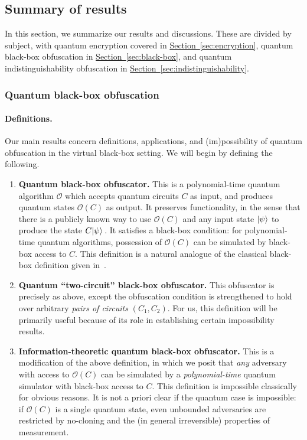 \documentclass[envcountsame]{llncs}
\numberwithin{equation}{section}
\newcommand{\expref}[2]{\texorpdfstring{\hyperref[#2]{#1~\ref{#2}}}{#1~\ref{#2}}}
\newcommand{\algo}{\mathcal}
\begin{document}
\subsection{Summary of results}

In this section, we summarize our results and discussions. These are divided by subject, with quantum encryption covered in \expref{Section}{sec:encryption}, quantum black-box obfuscation in \expref{Section}{sec:black-box}, and quantum indistinguishability obfuscation in \expref{Section}{sec:indistinguishability}.

\subsubsection{Quantum black-box obfuscation}

\paragraph{Definitions.} Our main results concern definitions, applications, and (im)possibility of quantum obfuscation in the virtual black-box setting. We will begin by defining the following.

\begin{enumerate}
\item \textbf{Quantum black-box obfuscator.} This is a polynomial-time quantum algorithm $\algo O$ which accepts quantum circuits $C$ as input, and produces quantum states $\algo O(C)$ as output. It preserves functionality, in the sense that there is a publicly known way to use $\algo O(C)$ and any input state ${\left\vert{\psi}\right\rangle}$ to produce the state $C {\left\vert{\psi}\right\rangle}$\,. It satisfies a black-box condition: for polynomial-time quantum algorithms, possession of $\algo O(C)$ can be simulated by black-box access to $C$. This definition is a natural analogue of the classical black-box definition given in~\cite{BGIRSVY12}.
\item \textbf{Quantum ``two-circuit'' black-box obfuscator.} This obfuscator is precisely as above, except the obfuscation condition is strengthened to hold over arbitrary \emph{pairs of circuits} $(C_1, C_2)$. For us, this definition will be primarily useful because of its role in establishing certain impossibility results.
\item \textbf{Information-theoretic quantum black-box obfuscator.} This is a modification of the above definition, in which we posit that \emph{any} adversary with access to $\algo O(C)$ can be simulated by a \emph{polynomial-time} quantum simulator with black-box access to $C$. This definition is impossible classically for obvious reasons. It is not a priori clear if the quantum case is impossible: if $\algo O(C)$ is a single quantum state, even unbounded adversaries are restricted by no-cloning and the (in general irreversible) properties of measurement.
\end{enumerate}
\end{document}
